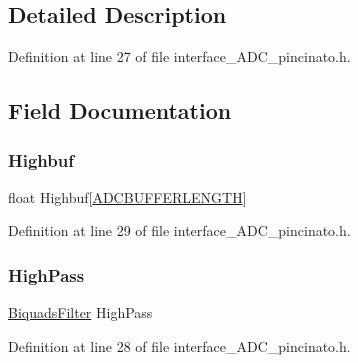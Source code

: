 \subsection{Detailed Description}


Definition at line 27 of file interface\+\_\+\+A\+D\+C\+\_\+pincinato.\+h.



\subsection{Field Documentation}
\mbox{\label{struct_process_data_____a4c0a993848fc70e7ee3eb5e55bf88fa2}} 
\subsubsection{\texorpdfstring{Highbuf}{Highbuf}}
{\footnotesize\ttfamily float Highbuf\mbox{[}\mbox{\hyperlink{interface___a_d_c__pincinato_8h_a2ddc9b0b00b7c686d5208fc298aeadb2}{A\+D\+C\+B\+U\+F\+F\+E\+R\+L\+E\+N\+G\+TH}}\mbox{]}}



Definition at line 29 of file interface\+\_\+\+A\+D\+C\+\_\+pincinato.\+h.

\mbox{\label{struct_process_data_____af13bc04872597bbd10728a615e35f0a8}} 
\subsubsection{\texorpdfstring{High\+Pass}{HighPass}}
{\footnotesize\ttfamily \mbox{\hyperlink{filter__math__pincinato_8h_a431282902bc1cfeb168d1acf574331bb}{Biquads\+Filter}} High\+Pass}



Definition at line 28 of file interface\+\_\+\+A\+D\+C\+\_\+pincinato.\+h.

\mbox{\label{struct_process_data_____a5e4aeedf9f04a1d8ee5bad2b8e0bf8af}} 
